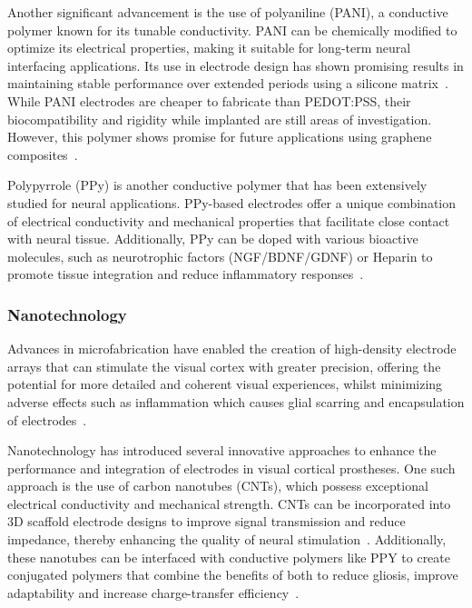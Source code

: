\documentclass[twocolumn,10pt]{article}
\begin{document}
Another significant advancement is the use of polyaniline (PANI), a conductive
polymer known for its tunable conductivity. PANI can be
chemically modified to optimize its electrical properties, making it suitable
for long-term neural interfacing applications. Its use in electrode design has
shown promising results in maintaining stable performance over extended periods
using a silicone matrix~\parencite{almuflehHighlyFlexiblePolyanilineBased2021}.
While PANI electrodes are cheaper to fabricate than PEDOT:PSS, their
biocompatibility and rigidity while implanted are still areas of investigation.
However, this polymer shows promise for future applications using graphene
composites~\parencite{liuBiocompatibleHighPerformanceWetAdhesive2021,fangBiocompatibleElectrodeExoelectrogens2024}.

Polypyrrole (PPy) is another conductive polymer that has been extensively
studied for neural applications. PPy-based electrodes offer a unique combination
of electrical conductivity and mechanical properties that facilitate close
contact with neural tissue. Additionally, PPy can be doped with various
bioactive molecules, such as neurotrophic factors (NGF/BDNF/GDNF) or Heparin to
promote tissue integration and reduce inflammatory
responses~\parencite{zareElectroconductiveMultifunctionalPolypyrrole2021a}.

\subsubsection*{Nanotechnology}
Advances in microfabrication have enabled the creation of high-density electrode
arrays that can stimulate the visual cortex with greater precision, offering the
potential for more detailed and coherent visual
experiences, whilst minimizing adverse effects such as inflammation which causes
glial scarring and encapsulation of electrodes~\parencite{ryuSpatiallyConfinedResponses2020}.

Nanotechnology has introduced several innovative approaches to enhance the
performance and integration of electrodes in visual cortical prostheses. One
such approach is the use of carbon nanotubes (CNTs), which possess exceptional
electrical conductivity and mechanical strength. CNTs can be incorporated into
3D scaffold electrode designs to improve signal transmission and reduce
impedance, thereby enhancing the quality of neural
stimulation~\parencite{alegretThreeDimensionalConductiveScaffolds2018}.
Additionally, these nanotubes can be interfaced with conductive polymers like
PPY to create conjugated polymers that combine the benefits of both to reduce
gliosis, improve adaptability and increase charge-transfer
efficiency~\parencite{sharCarbonNanotubeNanocomposite2023}.
\end{document}
